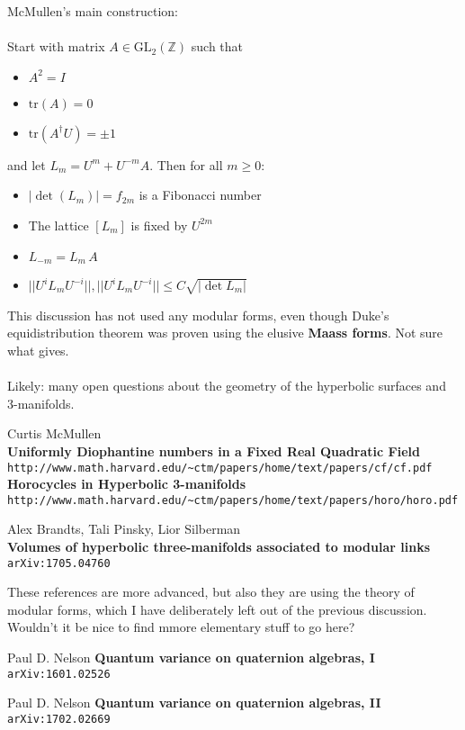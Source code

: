\documentclass[12pt]{article}
\begin{document}
\newpage

\noindent McMullen's main construction: \\ \\
Start with matrix $A \in \mathrm{GL}_2(\mathbb{Z})$ such that
\begin{itemize}
\item $A^2 = I$
\item $\mathrm{tr}(A) = 0$
\item $\mathrm{tr}(A^\dagger U) = \pm 1$
\end{itemize}
and let $L_m = U^m + U^{-m} A $.  Then for all $m \geq 0$:
\begin{itemize}
\item $|\det (L_m)| = f_{2m}$ is a Fibonacci number
\item The lattice $[L_m]$ is fixed by $U^{2m}$ 
\item $L_{-m}= L_m \, A$ 
\item $\big|\big| U^i L_m U^{-i}\big|\big| , \big|\big| U^i L_m U^{-i}\big|\big|   \leq C \sqrt{|\det{L_m}|} $ 
\end{itemize}

\newpage 

\noindent This discussion has not used any modular forms, even though Duke's equidistribution theorem was proven using the elusive \textbf{Maass forms}.  Not sure what gives. \\ \\
Likely: many open questions about the geometry of the hyperbolic surfaces and 3-manifolds.

\vfill

\begin{thebibliography}{}

\item Curtis McMullen \\ \textbf{Uniformly Diophantine numbers in a
Fixed Real Quadratic Field} \texttt{http://www.math.harvard.edu/\~{}ctm/papers/home/text/papers/cf/cf.pdf} \\
\textbf{Horocycles in Hyperbolic 3-manifolds} \\ \texttt{http://www.math.harvard.edu/\~{}ctm/papers/home/text/papers/horo/horo.pdf}

\item Alex Brandts, Tali Pinsky, Lior Silberman \\ \textbf{Volumes of hyperbolic three-manifolds associated to modular links} \texttt{arXiv:1705.04760}

\end{thebibliography}
These references are more advanced, but also they are using the theory of modular forms, which I have deliberately left out of the previous discussion.  Wouldn't it be nice to find mmore elementary stuff to go here?
\begin{thebibliography}{}

\item Paul D. Nelson
\textbf{Quantum variance on quaternion algebras, I} \;\texttt{arXiv:1601.02526}

\item Paul D. Nelson
 \textbf{Quantum variance on quaternion algebras, II} \texttt{arXiv:1702.02669}

\end{thebibliography}
\end{document}
